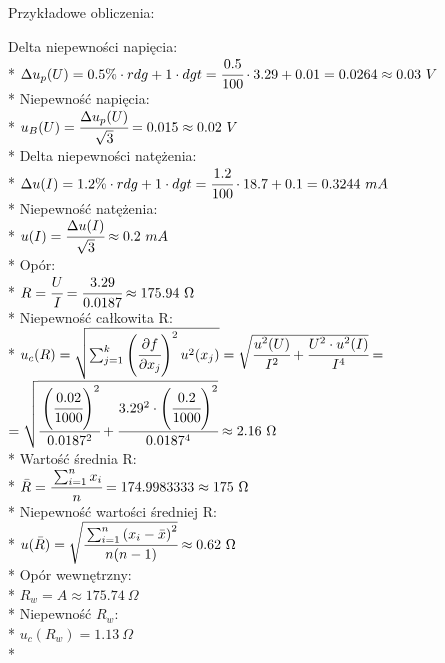 \documentclass{article}
\begin{document}
\begin{center}
    \begin{flushleft}
        Przykładowe obliczenia:\\
    \end{flushleft}
    Delta niepewności napięcia:\\*
    $\Delta u_p (U)  = 0.5\% \cdot rdg+1 \cdot dgt=\cfrac{0.5}{100} \cdot 3.29 + 0.01=0.0264\approx0.03 \ V$\\*
    \vspace{5mm}
    Niepewność napięcia:\\*
    $u_B (U)=\cfrac{\Delta u_p(U)}{\sqrt{3}}=0.015\approx0.02 \ V$\\*
    \vspace{5mm}
    Delta niepewności natężenia:\\* 
    $\Delta u(I) = 1.2\% \cdot rdg+1 \cdot dgt = \cfrac{1.2}{100} \cdot 18.7 +0.1 =0.3244 \ mA$\\*
    \vspace{5mm}
    Niepewność natężenia:\\*
    $u(I)= \cfrac{\Delta u(I)}{\sqrt{3}} \approx 0.2 \ mA$\\*
    \vspace{5mm}
    Opór:\\* 
    $R=\cfrac{U}{I} = \cfrac{3.29}{0.0187} \approx 175.94 \ \Omega$\\*
    \vspace{5mm}
    Niepewność całkowita R:\\*
    $u_c (R)=\sqrt{\sum_{j=1}^{k}\left( \cfrac{\partial f}{\partial x_j}\right)^2 u^2 (x_j)}
    =\sqrt{\cfrac{u^2 (U)}{I^2} + \cfrac{U^2 \cdot u^2 (I)}{I^4}}=$
    $= \sqrt{\cfrac{\left(\cfrac{0.02}{1000}\right)^2}{0.0187^2} + \cfrac{3.29^2 \cdot \left(\cfrac{0.2}{1000}\right)^2}{0.0187^4}}\approx 2.16 \ \Omega$\\* 
    \vspace{5mm}
    Wartość średnia R:\\* 
    $\bar{R} = \cfrac{\sum_{i=1}^{n}x_i}{n}=174.9983333 \approx 175 \ \Omega$\\*
    \vspace{5mm}
    Niepewność wartości średniej R:\\*
    $u(\bar{R}) = \sqrt{\cfrac{\sum_{i=1}^{n} \left(x_i - \bar{x} \right)^2}{n(n-1)}}\approx 0.62 \ \Omega$\\*
    \vspace{5mm}
    Opór wewnętrzny:\\* 
    $R_w =A\approx 175.74 \ \Omega$\\*
    \vspace{5mm}
    Niepewność $R_w$:\\*
    $u_c (R_w) = 1.13 \ \Omega$\\*

\end{center}
\newpage
\end{document}
